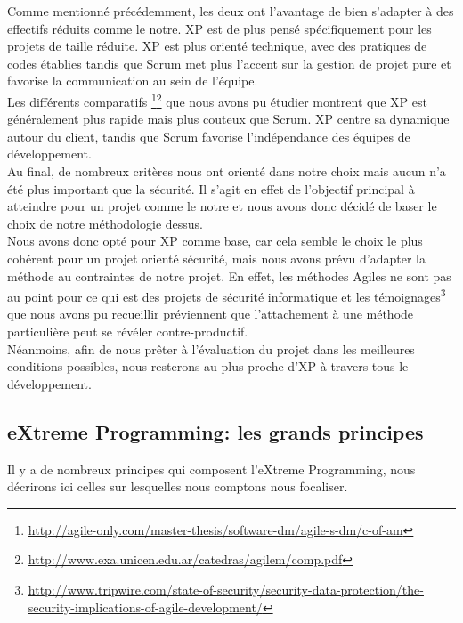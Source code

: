 \documentclass{../../res/univ-projet}
\begin{document}
	Comme mentionné précédemment, les deux ont l'avantage de bien s'adapter à des effectifs réduits comme le notre. XP est de plus pensé spécifiquement pour les projets de taille réduite. XP est plus orienté technique, avec des pratiques de codes établies tandis que Scrum met plus l'accent sur la gestion de projet pure et favorise la communication au sein de l'équipe.\\	

	Les différents comparatifs \footnote{\href{http://agile-only.com/master-thesis/software-dm/agile-s-dm/c-of-am}{http://agile-only.com/master-thesis/software-dm/agile-s-dm/c-of-am}}\footnote{\href{http://www.exa.unicen.edu.ar/catedras/agilem/comp.pdf}{http://www.exa.unicen.edu.ar/catedras/agilem/comp.pdf}} que nous avons pu étudier montrent que XP est généralement plus rapide mais plus couteux que Scrum. XP centre sa dynamique autour du client, tandis que Scrum favorise l'indépendance des équipes de développement.\\

	Au final, de nombreux critères nous ont orienté dans notre choix mais aucun n'a été plus important que la sécurité. Il s'agit en effet de l'objectif principal à atteindre pour un projet comme le notre et nous avons donc décidé de baser le choix de notre méthodologie dessus.\\
		
	Nous avons donc opté pour XP comme base, car cela semble le choix le plus cohérent pour un projet orienté sécurité, mais nous avons prévu d'adapter la méthode au contraintes de notre projet. En effet, les méthodes Agiles ne sont pas au point pour ce qui est des projets de sécurité informatique et les témoignages\footnote{\href{http://www.tripwire.com/state-of-security/security-data-protection/the-security-implications-of-agile-development/}{http://www.tripwire.com/state-of-security/security-data-protection/the-security-implications-of-agile-development/}} que nous avons pu recueillir préviennent que l'attachement à une méthode particulière peut se révéler contre-productif.\\

	Néanmoins, afin de nous prêter à l'évaluation du projet dans les meilleures conditions possibles, nous resterons au plus proche d'XP à travers tous le développement.
	
\subsection{eXtreme Programming: les grands principes}
	Il y a de nombreux principes qui composent l'eXtreme Programming, nous décrirons ici celles sur lesquelles nous comptons nous focaliser.
\end{document}

